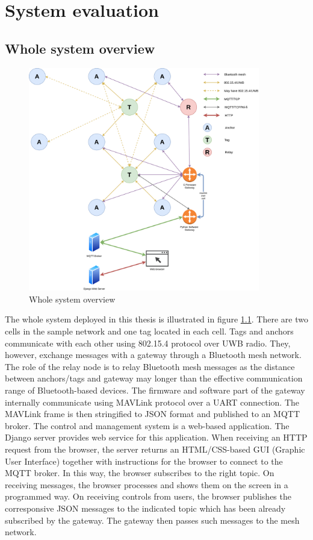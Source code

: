 \documentclass[\main/main.tex]{subfiles}
\begin{document}
\graphicspath{{img/}{06_result/img/}}

\chapter{System evaluation}

\section{Whole system overview}
\begin{figure}[H]
    \centering
    \includegraphics[width=0.9\textwidth]{system_overview.png}
    \caption{Whole system overview}
    \label{fig:system_overview}
\end{figure}
The whole system deployed in this thesis is illustrated in figure \ref{fig:system_overview}. There are two cells in the sample network and one tag located in each cell. Tags and anchors communicate with each other using 802.15.4 protocol over UWB radio. They, however, exchange messages with a gateway through a Bluetooth mesh network. The role of the relay node is to relay Bluetooth mesh messages as the distance between anchors/tags and gateway may longer than the effective communication range of Bluetooth-based devices. The firmware and software part of the gateway internally communicate using MAVLink protocol over a UART connection. The MAVLink frame is then stringified to JSON format and published to an MQTT broker. The control and management system is a web-based application. The Django server provides web service for this application. When receiving an HTTP request from the browser, the server returns an HTML/CSS-based GUI (Graphic User Interface) together with instructions for the browser to connect to the MQTT broker. In this way, the browser subscribes to the right topic. On receiving messages, the browser processes and shows them on the screen in a programmed way. On receiving controls from users, the browser publishes the corresponsive JSON messages to the indicated topic which has been already subscribed by the gateway. The gateway then passes such messages to the mesh network.
\end{document}
